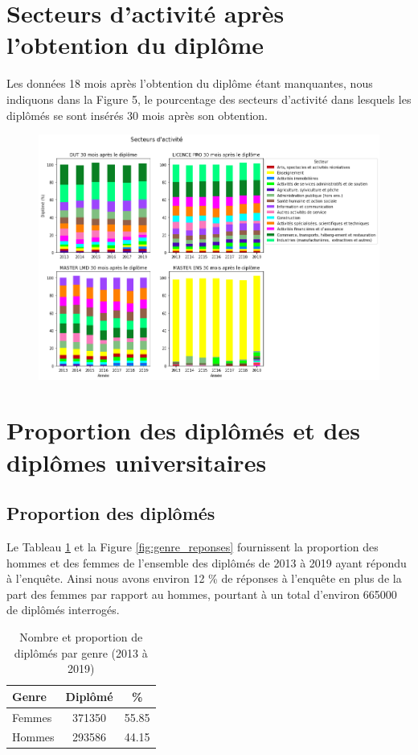 \documentclass[12pt, a4paper, titlepage, table]{article}
\begin{document}
\section{Secteurs d'activité après l'obtention du diplôme}
	Les données 18 mois après l'obtention du diplôme étant manquantes, nous indiquons dans la Figure 5, le pourcentage des secteurs d'activité dans lesquels les diplômés se sont insérés 30 mois après son obtention. 

	\begin{figure}[H]
		\centering
		\includegraphics[width=1\textwidth]{../graphs/repartition_secteurs_situation.png}
	\end{figure}

\section{Proportion des diplômés et des diplômes universitaires}

	\subsection{Proportion des diplômés}
	Le Tableau \ref{tab:genre_responses} et la Figure \ref{fig:genre_reponses} fournissent la proportion des hommes et des femmes de l'ensemble des diplômés de 2013 à 2019 ayant répondu à l'enquête. Ainsi nous avons environ 12 \% de réponses à l'enquête en plus de la part des femmes par rapport au hommes, pourtant à un total d'environ 665000 de diplômés interrogés.
		\begin{table}[H]
			\centering
			\begin{tabular}{lcc}
				\toprule
				\textbf{Genre} & \textbf{Diplômé} & \textbf{\%} \\
				\midrule
				Femmes & 371350 & 55.85 \\
				Hommes & 293586 & 44.15 \\
				\bottomrule
			\end{tabular}
			\caption{Nombre et proportion de diplômés par genre (2013 à 2019)}
			\label{tab:genre_responses}
		\end{table}
	
\end{document}
